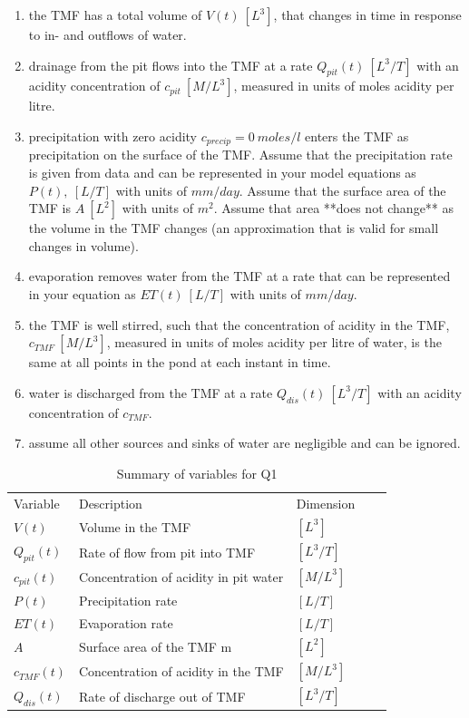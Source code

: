 \documentclass{article}
\begin{document}
\begin{enumerate}
\item  the TMF has a total volume of $V(t)~[L^3]$, that changes in time in response to in- and outflows of water.
\item drainage from the pit flows into the TMF at a rate $Q_{pit}(t)~[L^3/T]$ with an acidity concentration of $c_{pit}~[M/L^3]$, measured in units of moles acidity per litre.
\item precipitation with zero acidity $c_{precip} = 0~ moles/l$ enters the TMF as precipitation on the surface of the TMF. Assume that the precipitation rate is given from data and can be represented in your model equations as $P(t),~[L/T]$ with units of $mm/day$. Assume that the surface area of the TMF is $A~[L^2]$ with units of $m^2$. Assume that area **does not change** as the volume in the TMF changes (an approximation that is valid for small changes in volume). 
\item evaporation removes water from the TMF at a rate that can be represented in your equation as $ET(t)~[L/T]$ with units of $mm/day$. 
\item the TMF is well stirred, such that the concentration of acidity in the TMF, $c_{TMF}~[M/L^3]$, measured in units of moles acidity per litre of water, is the same at all points in the pond at each instant in time.
\item water is discharged from the TMF at a rate $Q_{dis}(t)~[L^3/T]$ with an acidity concentration of $c_{TMF}$.
\item assume all other sources and sinks of water are negligible and can be ignored.

\end{enumerate}
 

\begin{table}[H]
  \caption{Summary of variables for Q1}
  \begin{center}
\begin{tabular}{lllll}
Variable & Description    & Dimension  \\
$V(t)$ &  Volume in the TMF                               & $[L^3]$ \\
 $Q_{pit}(t)$    & Rate of flow from pit into TMF      & $[L^3/T]$\\
 $c_{pit}(t)$     & Concentration of acidity in pit water & $[M/L^3]$\\
 $P(t)$            & Precipitation rate                       & $[L/T]$ \\
$ET(t)$          & Evaporation rate                    & $[L/T]$  \\
$A$               & Surface area of the TMF m           &$[L^2]$  \\
 $c_{TMF}(t)$ & Concentration of acidity in the TMF & $[M/L^3]$ \\
 $Q_{dis}(t)$   & Rate of discharge out of TMF      & $[L^3/T]$ 

\end{tabular}
\end{center}
\end{table}
\end{document}
